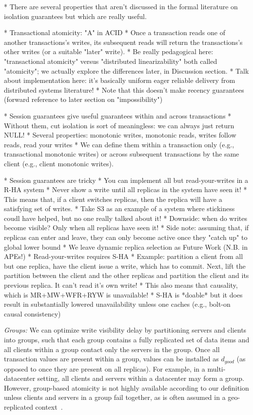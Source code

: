 * There are several properties that aren't discussed in the formal literature on isolation guarantees but which are really useful.

* Transactional atomicity: "A" in ACID
	* Once a transaction reads one of another transactions's writes, its subsequent reads will return the transactions's other writes (or a suitable "later" write).
	* Be really pedagogical here: "transactional atomicity" versus "distributed linearizability" both called "atomicity"; we actually explore the differences later, in Discussion section.
	* Talk about implementation here: it's basically uniform eager reliable delivery from distributed systems literature!
	* Note that this doesn't make recency guarantees (forward reference to later section on "impossibility")

* Session guarantees give useful guarantees within and across transactions
	* Without them, cut isolation is sort of meaningless: we can always just return NULL!
	* Several properties: monotonic writes, monotonic reads, writes follow reads, read your writes
	* We can define them within a transaction only (e.g., transactional monotonic writes) or across subsequent transactions by the same client (e.g., client monotonic writes).

* Session guarantees are tricky
	* You can implement all but read-your-writes in a R-HA system
		* Never show a write until all replicas in the system have seen it!
		* This means that, if a client switches replicas, then the replica will have a satisfying set of writes.
                * Take S3 as an example of a system where stickiness coudl have helped, but no one really talked about it!
		* Downside: when do writes become visible? Only when all replicas have seen it!
		* Side note: assuming that, if replicas can enter and leave, they can only become active once they "catch up" to global lower bound
			* We leave dynamic replica selection as Future Work (N.B. in APEs!)
	* Read-your-writes requires S-HA
		* Example: partition a client from all but one replica, have the client issue a write, which has to commit. Next, lift the partition between the client and the other replicas and partition the client and its previous replica. It can't read it's own write!
		* This also means that causality, which is MR+MW+WFR+RYW is unavailable!
		* S-HA is *doable* but it does result in substantially lowered unavailability unless one caches (e.g., bolt-on causal consistency)

\noindent\textit{Groups:} We can optimize write visibility delay by
partitioning servers and clients into groups, such that each group
contains a fully replicated set of data items and all clients within a
group contact only the servers in the group. Once all transaction
values are present within a group, values can be installed as
$d_{good}$ (as opposed to once they are present on all replicas). For
example, in a multi-datacenter setting, all clients and servers within
a datacenter may form a group. However, group-based atomicity is not
highly available according to our definition unless clients and
servers in a group fail together, as is often assumed in a
geo-replicated context~\cite{cops, eiger}.

